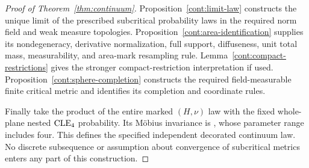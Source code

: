 \begin{proof}[Proof of Theorem~\ref{thm:continuum}]
Proposition~\ref{cont:limit-law} constructs the unique limit of the prescribed
subcritical probability laws in the required norm field and weak measure
topologies.  Proposition~\ref{cont:area-identification} supplies its
nondegeneracy, derivative normalization, full support, diffuseness,
unit total mass, measurability, and area-mark resampling rule.
Lemma~\ref{cont:compact-restrictions} gives the stronger compact-restriction
interpretation if used.  Proposition~\ref{cont:sphere-completion} constructs
the required field-measurable finite critical metric and identifies its
completion and coordinate rules.

Finally take the product of the entire marked $(H,\nu)$ law with the fixed
whole-plane nested $\mathrm{CLE}_4$ probability.  Its M\"obius invariance is
\cite[Theorem 1]{KWnested}, whose parameter range includes four.  This
defines the specified independent decorated continuum law.  No discrete
subsequence or assumption about convergence of subcritical metrics enters
any part of this construction.
\end{proof}
